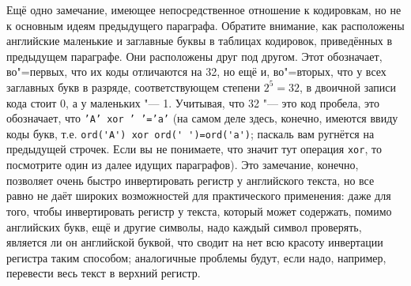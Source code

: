 
Ещё одно замечание, имеющее непосредственное отношение к кодировкам, но не к основным идеям 
предыдущего параграфа. Обратите внимание, как расположены английские маленькие и заглавные буквы в 
таблицах кодировок, приведённых в предыдущем параграфе. Они расположены друг под другом. Этот 
обозначает, во"=первых, что их коды отличаются на 32, но ещё и, во"=вторых, что у всех заглавных 
букв в разряде, соответствующем степени $2^5=32$, в двоичной записи кода стоит 0, а у маленьких "--- 1. Учитывая,
что 32 "--- это код пробела, это обозначает, что \texttt{'A' xor ' '='a'} (на самом деле здесь, 
конечно, имеются ввиду коды букв, т.е. \verb|ord('A') xor ord(' ')=ord('a')|; паскаль вам ругнётся 
на предыдущей строчек. Если вы не понимаете, что значит тут операция \verb|xor|, то посмотрите один 
из далее идущих параграфов). Это замечание, конечно, позволяет очень быстро инвертировать регистр у 
английского текста, но все равно не даёт широких возможностей для практического применения: даже 
для того, чтобы инвертировать регистр у текста, который может содержать, помимо английских букв, 
ещё и другие символы, надо каждый символ проверять, является ли он английской буквой, что сводит на 
нет всю красоту инвертации регистра таким способом; аналогичные проблемы будут, если надо, 
например, перевести весь текст в верхний регистр.

